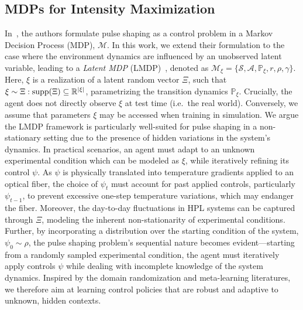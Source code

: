 \subsection{MDPs for Intensity Maximization}\label{sec:mdp}
In~\cite{capuano2023temporl}, the authors formulate pulse shaping as a control problem in a Markov Decision Process (MDP), \( \mathcal{M} \). In this work, we extend their formulation to the case where the environment dynamics are influenced by an unobserved latent variable, leading to a \textit{Latent MDP} (LMDP)~\citep{chen2021understanding}, denoted as \(\mathcal{M}_\xi = \{\mathcal{S}, \mathcal{A}, \mathbb{P}_\xi, r, \rho, \gamma\}\). Here, \( \xi \) is a realization of a latent random vector \( \Xi \), such that \(\xi \sim \Xi : \operatorname{supp}(\Xi) \subseteq \mathbb{R}^{|\xi|}\), parametrizing the transition dynamics \( \mathbb{P}_\xi \). Crucially, the agent does not directly observe \( \xi \) at test time (i.e.~the real world).
Conversely, we assume that parameters \( \xi \) may be accessed when training in simulation.
We argue the LMDP framework is particularly well-suited for pulse shaping in a non-stationary setting due to the presence of hidden variations in the system's dynamics. In practical scenarios, an agent must adapt to an unknown experimental condition which can be modeled as \( \xi \), while iteratively refining its control \( \psi \). As \( \psi \) is physically translated into temperature gradients applied to an optical fiber, the choice of \( \psi_t \) must account for past applied controls, particularly \( \psi_{t-1} \), to prevent excessive one-step temperature variations, which may endanger the fiber. Moreover, the day-to-day fluctuations in HPL systems can be captured through \( \Xi\), modeling the inherent non-stationarity of experimental conditions. Further, by incorporating a distribution over the starting condition of the system, \( \psi_0 \sim \rho \), the pulse shaping problem's sequential nature becomes evident---starting from a randomly sampled experimental condition, the agent must iteratively apply controls \(\psi\) while dealing with incomplete knowledge of the system dynamics.
Inspired by the domain randomization and meta-learning literatures, we therefore aim at learning control policies that are robust and adaptive to unknown, hidden contexts.

